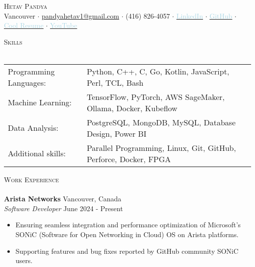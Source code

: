 \documentclass[a4paper]{article}
\newcommand{\lineunder} {
    \vspace*{-8pt} \\
    \hspace*{-18pt} \hrulefill \\
}
\newcommand{\header} [1] {
    {\hspace*{-18pt}\vspace*{6pt} \textsc{#1}}
    \vspace*{-6pt} \lineunder
}
\begin{document}
\vspace*{-50pt}



\vspace*{-10pt}
\begin{center}
	{\Huge \scshape {Hetav Pandya}}\\
	Vancouver $\cdot$ \href{mailto:pandyahetav1@gmail.com}{pandyahetav1@gmail.com} $\cdot$ (416) 826-4057 $\cdot$ \href{https://www.linkedin.com/in/hetav-pandya}{\textcolor{lightblue}{LinkedIn}} $\cdot$ \href{https://github.com/pandyah5}{\textcolor{lightblue}{GitHub}} $\cdot$ \href{https://pandyah5.github.io/terminalresume.github.io/}{\textcolor{lightblue}{Cool Resume}} $\cdot$ \href{https://www.youtube.com/channel/UCShTJOo9ywLntiM4cqOz-KA}{\textcolor{lightblue}{YouTube}}\\
\end{center}

\header{Skills}
\begin{small}
\begin{tabular}{ l l }
    Programming Languages: & Python, C++, C, Go, Kotlin, JavaScript, Perl, TCL, Bash             \\ 
	Machine Learning:      & TensorFlow, PyTorch, AWS SageMaker, Ollama, Docker, Kubeflow             \\
	Data Analysis:         & PostgreSQL, MongoDB, MySQL, Database Design, Power BI            \\
    Additional skills:     & Parallel Programming, Linux, Git, GitHub, Perforce, Docker, FPGA                      \\                               
\end{tabular}
\end{small}
\vspace{2mm}

\header{Work Experience}

\textbf{Arista Networks} \hfill Vancouver, Canada\\
\textit{Software Developer} \hfill June 2024 - Present\\
\vspace{-2.5mm}
\begin{itemize} \itemsep 1pt
    \item Ensuring seamless integration and performance optimization of Microsoft's SONiC (Software for Open Networking in Cloud) OS on Arista platforms.
    \item Supporting features and bug fixes reported by GitHub community SONiC users.
    \vspace{-1.5mm}
\end{itemize}
\end{document}

